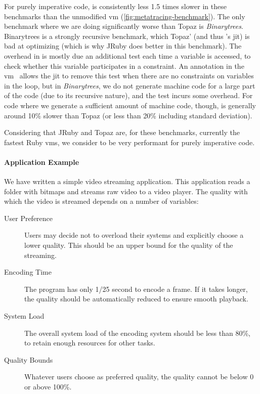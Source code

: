 For purely imperative code, \toolname is consistently less 1.5 times
slower in these benchmarks than the unmodified \ac{vm}
(\autoref{fig:metatracing-benchmark}). The only benchmark where we are
doing significantly worse than Topaz is
\emph{Binarytrees}. Binarytrees is a strongly recursive benchmark,
which Topaz' (and thus \toolname's \ac{jit}) is bad at optimizing
(which is why JRuby does better in this benchmark). The overhead in
\toolname is mostly due an additional test each time a variable is
accessed, to check whether this variable participates in a
constraint. An annotation in the \ac{vm}~\cite{bolz2011runtime} allows
the \ac{jit} to remove this test when there are no constraints on
variables in the loop, but in \emph{Binarytrees}, we do not generate
machine code for a large part of the code (due to its recursive
nature), and the test incurs some overhead. For code where we generate
a sufficient amount of machine code, though, \toolname is generally
around 10\% slower than Topaz (or less than 20\% including standard
deviation).

Considering that JRuby and Topaz are, for these benchmarks, currently
the fastest Ruby \acp{vm}, we consider \toolname to be very performant
for purely imperative code.

\paragraph{Application Example}
We have written a simple video streaming application. This application
reads a folder with bitmaps and streams raw video to a video
player. The quality with which the video is streamed depends on a
number of variables:
\begin{description}
\item[User Preference] Users may decide not to overload their systems
  and explicitly choose a lower quality. This should be an upper
  bound for the quality of the streaming.
\item[Encoding Time] The program has only 1/25 second to encode a
  frame. If it takes longer, the quality should be automatically
  reduced to ensure smooth playback.
\item[System Load] The overall system load of the encoding system
  should be less than 80\%, to retain enough resources for other tasks.
\item[Quality Bounds] Whatever users choose as preferred quality, the
  quality cannot be below 0 or above 100\%.
\end{description}

